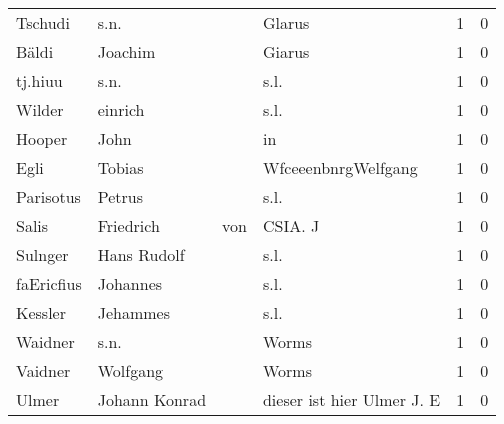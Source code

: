 \documentclass[10pt,a4paper,landscape]{article}
\begin{document}
\begin{longtable}{llllrr}
                  Tschudi &                               s.n. &             &                                      Glarus &          1 &         0 \\
                    Bäldi &                            Joachim &             &                                      Giarus &          1 &         0 \\
                  tj.hiuu &                               s.n. &             &                                        s.l. &          1 &         0 \\
                   Wilder &                            einrich &             &                                        s.l. &          1 &         0 \\
                   Hooper &                               John &             &                                          in &          1 &         0 \\
                     Egli &                             Tobias &             &                         WfceeenbnrgWelfgang &          1 &         0 \\
                Parisotus &                             Petrus &             &                                        s.l. &          1 &         0 \\
                    Salis &                          Friedrich &         von &                                     CSIA. J &          1 &         0 \\
                  Sulnger &                        Hans Rudolf &             &                                        s.l. &          1 &         0 \\
               faEricfius &                           Johannes &             &                                        s.l. &          1 &         0 \\
                  Kessler &                           Jehammes &             &                                        s.l. &          1 &         0 \\
                  Waidner &                               s.n. &             &                                       Worms &          1 &         0 \\
                  Vaidner &                           Wolfgang &             &                                       Worms &          1 &         0 \\
                    Ulmer &                      Johann Konrad &             &                  dieser ist hier Ulmer J. E &          1 &         0 \\

\end{longtable}
\end{document}
